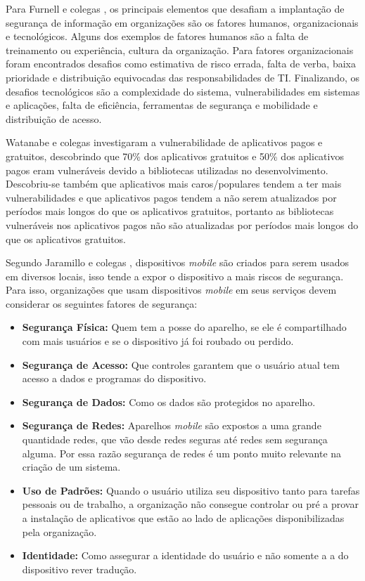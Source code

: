 Para Furnell e colegas \cite{furnell2009integrated}, os principais elementos que desafiam a implantação de segurança de informação em organizações são os fatores humanos, organizacionais e tecnológicos. Alguns dos exemplos de fatores humanos são a falta de treinamento ou experiência, cultura da organização. Para fatores organizacionais foram encontrados desafios como estimativa de risco errada, falta de verba, baixa prioridade e distribuição equivocadas das responsabilidades de TI. Finalizando, os desafios tecnológicos são a complexidade do sistema, vulnerabilidades em sistemas e aplicações, falta de eficiência, ferramentas de segurança e mobilidade e distribuição de acesso.

Watanabe e colegas \cite{watanabe2017understanding} investigaram a vulnerabilidade de aplicativos pagos e gratuitos, descobrindo que 70{\%} dos aplicativos gratuitos e 50{\%} dos aplicativos pagos eram vulneráveis devido a bibliotecas utilizadas no desenvolvimento. Descobriu-se também que aplicativos mais caros/populares tendem a ter mais vulnerabilidades e que aplicativos pagos tendem a não serem atualizados por períodos mais longos do que os aplicativos gratuitos, portanto as bibliotecas vulneráveis nos aplicativos pagos não são atualizadas por períodos mais longos do que os aplicativos gratuitos.

Segundo Jaramillo e colegas \cite{jaramillo2013cross}, dispositivos \textit{mobile} são criados para serem usados em diversos locais, isso tende a expor o dispositivo a mais riscos de segurança.  Para isso, organizações que usam dispositivos \textit{mobile} em seus serviços devem considerar os seguintes fatores de segurança:
\begin{itemize}
    \item \textbf{Segurança Física:} Quem tem a posse do aparelho, se ele é compartilhado com mais usuários e se o dispositivo já foi roubado ou perdido.
    \item \textbf{Segurança de Acesso:} Que controles garantem que o usuário atual tem acesso a dados e programas do dispositivo.   
    \item \textbf{Segurança de Dados:} Como os dados são protegidos no aparelho. 
    \item \textbf{Segurança de Redes:} Aparelhos \textit{mobile} são expostos a uma grande quantidade redes, que vão desde redes seguras até redes sem segurança alguma. Por essa razão segurança de redes é um ponto muito relevante na criação de um sistema.
    \item \textbf{Uso de Padrões:} Quando o usuário utiliza seu dispositivo tanto para tarefas pessoais ou de trabalho, a organização não consegue controlar ou  pré a provar a instalação de aplicativos que estão ao lado de aplicações disponibilizadas pela organização. 
    \item \textbf{Identidade:} Como assegurar a identidade do usuário e não somente a a do dispositivo rever tradução.
\end{itemize}

